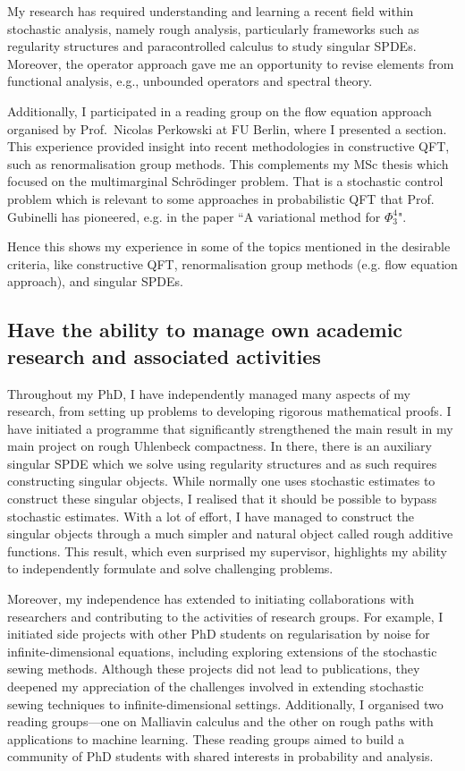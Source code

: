 \documentclass[12pt]{article}
\numberwithin{equation}{section}
\theoremstyle{definition}
\theoremstyle{remark}
\newcommand{\1}{\mathbf 1}
\newcommand{\<}{\langle}
\renewcommand{\>}{\rangle}
\begin{document}
My research has required understanding and learning a recent field within stochastic analysis, namely rough analysis, particularly frameworks such as regularity structures and paracontrolled calculus to study singular SPDEs.  Moreover, the operator approach gave me an opportunity to revise elements from functional analysis, e.g., unbounded operators and spectral theory.

Additionally, I participated in a reading group on the flow equation approach organised by Prof.\ Nicolas Perkowski at FU Berlin, where I presented a section. This experience provided insight into recent methodologies in constructive QFT, such as renormalisation group methods. This complements my MSc thesis which focused on the multimarginal Schrödinger problem. That is a stochastic control problem which is relevant to some approaches in probabilistic QFT that Prof. Gubinelli has pioneered, e.g. in the paper ``A variational method for $\Phi^4_3$".

Hence this shows my experience in some of the topics mentioned in the desirable criteria, like constructive QFT, renormalisation group methods (e.g. flow equation approach), and singular SPDEs.


\subsection{Have the ability to manage own academic research and associated activities}
Throughout my PhD, I have independently managed many aspects of my research, from setting up problems to developing rigorous mathematical proofs. I have initiated a programme that significantly strengthened the main result in my main project on rough Uhlenbeck compactness. In there, there is an auxiliary singular SPDE which we solve using regularity structures and as such requires constructing singular objects. While normally one uses stochastic estimates to construct these singular objects, I realised that it should be possible to bypass stochastic estimates. 
With a lot of effort, I have managed to construct the singular objects through a much simpler and natural object called rough additive functions. This result, which even surprised my supervisor, highlights my ability to independently formulate and solve challenging problems.

Moreover, my independence has extended to initiating collaborations with researchers and contributing to the activities of research groups. For example, I initiated side projects with other PhD students on regularisation by noise for infinite-dimensional equations, including exploring extensions of the stochastic sewing methods. Although these projects did not lead to publications, they deepened my appreciation of the challenges involved in extending stochastic sewing techniques to infinite-dimensional settings. Additionally, I organised two reading groups—one on Malliavin calculus and the other on rough paths with applications to machine learning. These reading groups aimed to build a community of PhD students with shared interests in probability and analysis. 
\end{document}

